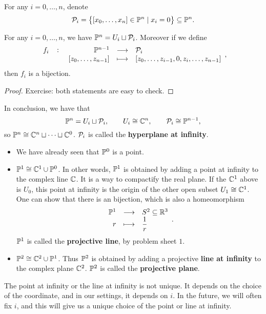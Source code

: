 \begin{notation}
For any $ i = 0, \dots, n $, denote
$$ \PP_i = \cbr{\sbr{x_0, \dots, x_n} \in \P^n \mid x_i = 0} \subseteq \P^n. $$
\end{notation}

\begin{lemma}
\label{lem:3.13}
For any $ i = 0, \dots, n $, we have $ \P^n = U_i \sqcup \PP_i $. Moreover if we define
$$ \function[f_i]{\P^{n - 1}}{\PP_i}{\sbr{z_0, \dots, z_{n - 1}}}{\sbr{z_0, \dots, z_{i - 1}, 0, z_i, \dots, z_{n - 1}}}, $$
then $ f_i $ is a bijection.
\end{lemma}

\begin{proof}
Exercise: both statements are easy to check.
\end{proof}

In conclusion, we have that
$$ \P^n = U_i \sqcup \PP_i, \qquad U_i \cong \C^n, \qquad \PP_i \cong \P^{n - 1}, $$
so $ \P^n \cong \C^n \sqcup \dots \sqcup \C^0 $. $ \PP_i $ is called the \textbf{hyperplane at infinity}.

\begin{example}
\hfill
\begin{itemize}
\item We have already seen that $ \P^0 $ is a point.
\item $ \P^1 \cong \C^1 \cup \P^0 $. In other words, $ \P^1 $ is obtained by adding a point at infinity to the complex line $ \C $. It is a way to compactify the real plane. If the $ \C^1 $ above is $ U_0 $, this point at infinity is the origin of the other open subset $ U_1 \cong \C^1 $. One can show that there is an bijection, which is also a homeomorphism
$$ \function{\P^1}{S^2 \subseteq \R^3}{r}{\dfrac{1}{r}}. $$
$ \P^1 $ is called the \textbf{projective line}, by problem sheet $ 1 $.
\item $ \P^2 \cong \C^2 \cup \P^1 $. Thus $ \P^2 $ is obtained by adding a projective \textbf{line at infinity} to the complex plane $ \C^2 $. $ \P^2 $ is called the \textbf{projective plane}.
\end{itemize}
\end{example}

\begin{note*}
The point at infinity or the line at infinity is not unique. It depends on the choice of the coordinate, and in our settings, it depends on $ i $. In the future, we will often fix $ i $, and this will give us a unique choice of the point or line at infinity.
\end{note*}

